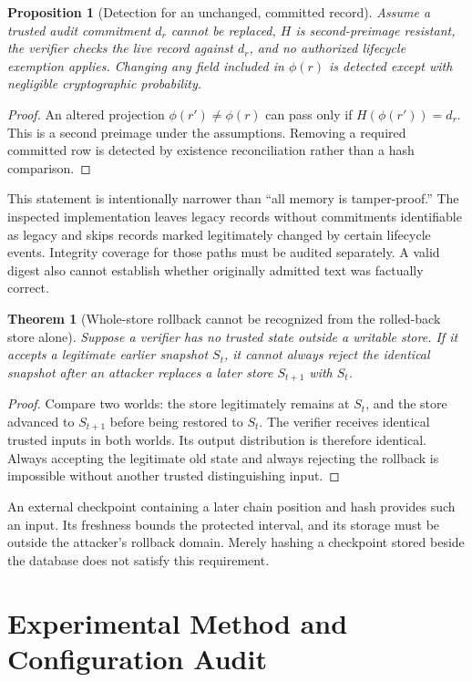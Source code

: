 \documentclass[11pt]{article}
\newtheorem{proposition}{Proposition}
\newtheorem{theorem}{Theorem}
\begin{document}
\begin{proposition}[Detection for an unchanged, committed record]
Assume a trusted audit commitment $d_r$ cannot be replaced, $H$ is second-preimage resistant, the verifier checks the live record against $d_r$, and no authorized lifecycle exemption applies. Changing any field included in $\phi(r)$ is detected except with negligible cryptographic probability.
\end{proposition}
\begin{proof}
An altered projection $\phi(r')\neq\phi(r)$ can pass only if $H(\phi(r'))=d_r$. This is a second preimage under the assumptions. Removing a required committed row is detected by existence reconciliation rather than a hash comparison.
\end{proof}
This statement is intentionally narrower than ``all memory is tamper-proof.'' The inspected implementation leaves legacy records without commitments identifiable as legacy and skips records marked legitimately changed by certain lifecycle events. Integrity coverage for those paths must be audited separately. A valid digest also cannot establish whether originally admitted text was factually correct.

\begin{theorem}[Whole-store rollback cannot be recognized from the rolled-back store alone]
Suppose a verifier has no trusted state outside a writable store. If it accepts a legitimate earlier snapshot $S_t$, it cannot always reject the identical snapshot after an attacker replaces a later store $S_{t+1}$ with $S_t$.
\end{theorem}
\begin{proof}
Compare two worlds: the store legitimately remains at $S_t$, and the store advanced to $S_{t+1}$ before being restored to $S_t$. The verifier receives identical trusted inputs in both worlds. Its output distribution is therefore identical. Always accepting the legitimate old state and always rejecting the rollback is impossible without another trusted distinguishing input.
\end{proof}
An external checkpoint containing a later chain position and hash provides such an input. Its freshness bounds the protected interval, and its storage must be outside the attacker's rollback domain. Merely hashing a checkpoint stored beside the database does not satisfy this requirement.

\section{Experimental Method and Configuration Audit}
\label{sec:methods}
\end{document}
